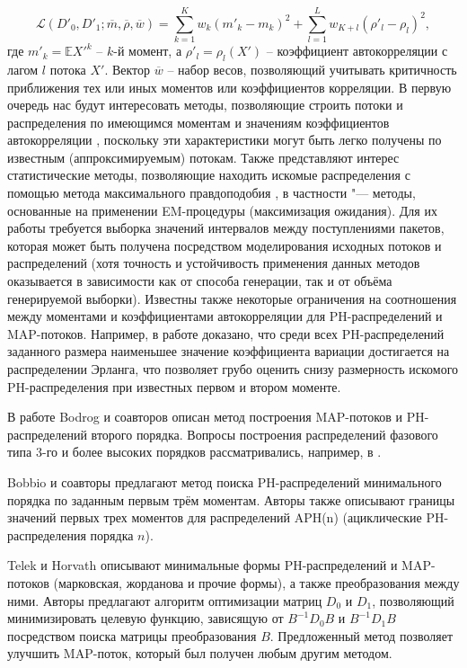 $$
\mathcal{L}(D'_0, D'_1; \overline{m}, \overline{\rho}, \overline{w}) =
\sum\limits_{k=1}^K w_k (m'_k - m_k)^2 + \sum\limits_{l=1}^L w_{K+l} (\rho'_l - \rho_l)^2,
$$
где $m'_k = \mathbb{E}X'^k$ -- $k$-й момент, а $\rho'_l = \rho_l(X')$ -- коэффициент автокорреляции с лагом $l$ потока $X'$. Вектор $\overline{w}$ -- набор весов, позволяющий учитывать критичность приближения тех или иных моментов или коэффициентов корреляции.
В первую очередь нас будут интересовать методы, позволяющие строить потоки и распределения по имеющимся моментам и значениям коэффициентов автокорреляции \cite{2005-Horvath_Buccholz_Telek}, поскольку эти характеристики могут быть легко получены по известным (аппроксимируемым) потокам. Также представляют интерес статистические методы, позволяющие находить искомые распределения с помощью метода максимального правдоподобия \cite{2013_Horvath_Okamura,2009_Okamura_Dohi,2005_Thummler_Buchholz_Telek}, в частности "--- методы, основанные на применении EM-процедуры (максимизация ожидания). Для их работы требуется выборка значений интервалов между поступлениями пакетов, которая может быть получена посредством моделирования исходных потоков и распределений (хотя точность и устойчивость применения данных методов оказывается в зависимости как от способа генерации, так и от объёма генерируемой выборки). Известны также некоторые ограничения на соотношения между моментами и коэффициентами автокорреляции для PH-распределений и MAP-потоков. Например, в работе \cite{1987-Aldous-Shepp} доказано, что среди всех PH-распределений заданного размера наименьшее значение коэффициента вариации достигается на распределении Эрланга, что позволяет грубо оценить снизу размерность искомого PH-распределения при известных первом и втором моменте.

В работе Bodrog и соавторов \cite{2008-Bodrog-Heindl-Horvath-Telek} описан метод построения MAP-потоков и PH-распределений второго порядка. Вопросы построения распределений фазового типа 3-го и более высоких порядков рассматривались, например, в \cite{2005-Bobbio-Horvath-Telek, 2016-Horvath-etal, 2007-Horvath-Telek}.

Bobbio и соавторы \cite{2005-Bobbio-Horvath-Telek} предлагают метод поиска PH-распределений минимального порядка по заданным первым трём моментам. Авторы также описывают границы значений первых трех моментов для распределений APH(n) (ациклические PH-распределения порядка $n$).

Telek и Horvath \cite{2007_Telek_Horvath} описывают минимальные формы PH-распределений и MAP-потоков (марковская, жорданова и прочие формы), а также преобразования между ними. Авторы предлагают алгоритм оптимизации матриц $D_0$ и $D_1$, позволяющий минимизировать целевую функцию, зависящую от $B^{-1}D_{0}B$ и $B^{-1}D_{1}B$ посредством поиска матрицы преобразования $B$. Предложенный метод позволяет улучшить MAP-поток, который был получен любым другим методом.


